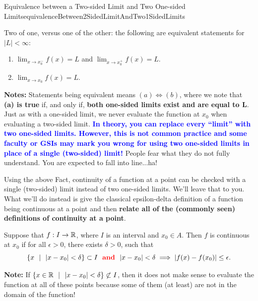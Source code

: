\bigskip



\begin{factColor}{Equivalence between a Two-sided Limit and Two One-sided Limits}{equivalenceBetween2SidedLimitAndTwo1SidedLimits}

Two of one, versus one of the other: the following are equivalent statements for $|L| < \infty$:
    \begin{enumerate}
\renewcommand{\labelenumi}{(\alph{enumi})}
\setlength{\itemsep}{.2cm}

    \item $\displaystyle \lim_{x \to x_0^-} f(x) = L$ and $\displaystyle  \lim_{x \to x_0^+} f(x) = L$. 

    \item $\displaystyle  \lim_{x \to x_0} f(x) = L. $
    \end{enumerate}

 \textbf{Notes:} 
Statements being equivalent means $(a) \iff (b)$, where we note that \textbf{(a) is true} if, and only if, \textbf{both one-sided limits exist and are equal to $\bm{L}$}. Just as with a one-sided limit, we never evaluate the function at $x_0$ when evaluating a two-sided limit. \textcolor{blue}{\bf In theory, you can replace every ``limit'' with two one-sided limits. However, this is not common practice and some faculty or GSIs may mark you wrong for using two one-sided limits in place of a single (two-sided) limit!} People fear what they do not fully understand. You are expected to fall into line...ha! 
\end{factColor}

\bigskip

Using the above Fact, continuity of a function at a point can be checked with a single (two-sided) limit instead of two one-sided limits. We'll leave that to you. What we'll do instead is give the classical epsilon-delta definition of a function being continuous at a point and then \textbf{relate all of the (commonly seen) definitions of continuity at a point}. 

\bigskip

\begin{tcolorbox}[colback=mylightblue, title = {\bf Classical Definition of Continuity at a Point}, breakable]

\begin{definition} \label{def:ClassicalDefinitionContinuityAtPoint} Suppose that $f:I \to \mathbb R$, where $I$ is an interval and $x_0 \in A$. Then  $f$ is continuous at $x_0$ if for all $\epsilon>0$, there exists $\delta >0$, such that 
$$\{ x ~~|~~ |x-x_0| < \delta\} \subset I  ~~\textcolor{red}{\bf and }~~ |x-x_0| < \delta \implies |f(x) -f(x_0)| \le \epsilon.$$

\textbf{Note:} If $ \{ x \in \mathbb R~~|~~ |x-x_0| < \delta\} \not \subset I$, then it does not make sense to evaluate the function at all of these points because some of them (at least) are not in the domain of the function! 
\end{definition}

\end{tcolorbox}

